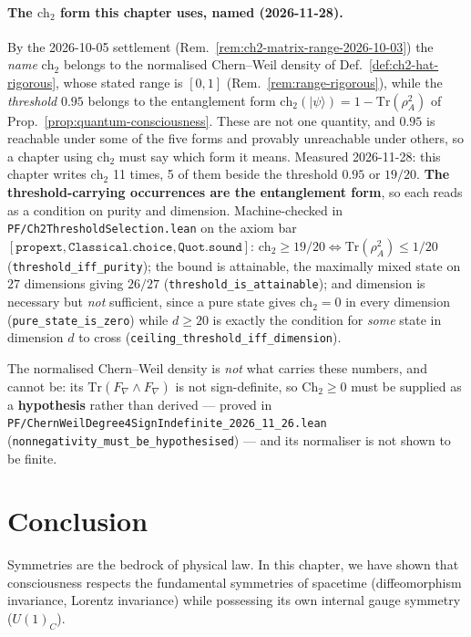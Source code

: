 \paragraph{The $\text{ch}_2$ form this chapter uses, named (2026-11-28).}
By the 2026-10-05 settlement (Rem.~\ref{rem:ch2-matrix-range-2026-10-03}) the
\emph{name} $\text{ch}_2$ belongs to the normalised Chern--Weil density of
Def.~\ref{def:ch2-hat-rigorous}, whose stated range is $[0,1]$
(Rem.~\ref{rem:range-rigorous}), while the \emph{threshold} $0.95$ belongs to the
entanglement form $\text{ch}_2(|\psi\rangle) = 1 - \mathrm{Tr}(\rho_A^2)$ of
Prop.~\ref{prop:quantum-consciousness}. These are not one quantity, and $0.95$ is
reachable under some of the five forms and provably unreachable under others, so a
chapter using $\text{ch}_2$ must say which form it means.
Measured 2026-11-28: this chapter writes $\text{ch}_2$ 11 times, 5 of them
beside the threshold $0.95$ or $19/20$. \textbf{The threshold-carrying occurrences
are the entanglement form}, so each reads as a condition on purity and dimension.
Machine-checked in \texttt{PF/Ch2ThresholdSelection.lean} on the axiom bar
$[\mathtt{propext}, \mathtt{Classical.choice}, \mathtt{Quot.sound}]$:
$\text{ch}_2 \geq 19/20 \iff \mathrm{Tr}(\rho_A^2) \leq 1/20$
(\texttt{threshold\_iff\_purity}); the bound is attainable, the maximally mixed
state on $27$ dimensions giving $26/27$ (\texttt{threshold\_is\_attainable}); and
dimension is necessary but \emph{not} sufficient, since a pure state gives
$\text{ch}_2 = 0$ in every dimension (\texttt{pure\_state\_is\_zero}) while
$d \geq 20$ is exactly the condition for \emph{some} state in dimension $d$ to
cross (\texttt{ceiling\_threshold\_iff\_dimension}).

\noindent The normalised Chern--Weil density is \emph{not} what carries these
numbers, and cannot be: its $\mathrm{Tr}(F_\nabla \wedge F_\nabla)$ is not
sign-definite, so $\mathrm{Ch}_2 \geq 0$ must be supplied as a \textbf{hypothesis}
rather than derived --- proved in
\texttt{PF/ChernWeilDegree4SignIndefinite\_2026\_11\_26.lean}
(\texttt{nonnegativity\_must\_be\_hypothesised}) --- and its normaliser is not
shown to be finite.


\section{Conclusion}

Symmetries are the bedrock of physical law. In this chapter, we have shown that consciousness respects the fundamental symmetries of spacetime (diffeomorphism invariance, Lorentz invariance) while possessing its own internal gauge symmetry ($U(1)_C$).

